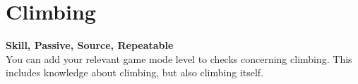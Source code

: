 \section{Climbing}\label{sec:climbing}
\textbf{Skill, Passive, Source, Repeatable}\\
You can add your relevant game mode level to checks concerning climbing.
This includes knowledge about climbing, but also climbing itself.